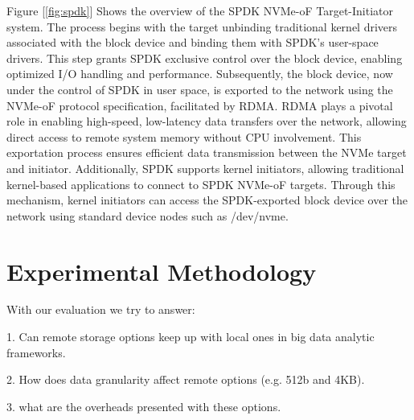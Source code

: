 \documentclass[nonacm,sigplan]{acmart}
\begin{document}
\par Figure [\ref{fig:spdk}] Shows the overview of the SPDK NVMe-oF Target-Initiator system. The process begins with the target unbinding traditional kernel drivers associated with the block device and binding them with SPDK's user-space drivers. This step grants SPDK exclusive control over the block device, enabling optimized I/O handling and performance. Subsequently, the block device, now under the control of SPDK in user space, is exported to the network using the NVMe-oF protocol specification, facilitated by RDMA. RDMA plays a pivotal role in enabling high-speed, low-latency data transfers over the network, allowing direct access to remote system memory without CPU involvement. This exportation process ensures efficient data transmission between the NVMe target and initiator. Additionally, SPDK supports kernel initiators, allowing traditional kernel-based applications to connect to SPDK NVMe-oF targets. Through this mechanism, kernel initiators can access the SPDK-exported block device over the network using standard device nodes such as /dev/nvme.


\section{Experimental Methodology}
With our evaluation we try to answer: 

1. Can remote storage options keep up with local ones in big data analytic
    frameworks.

2. How does data granularity affect remote options (e.g. 512b and 4KB).

3. what are the overheads presented with these options.

\vspace{1em}
\end{document}
